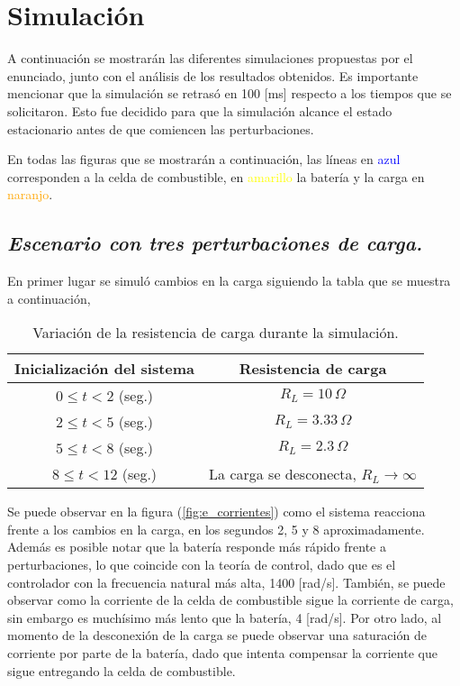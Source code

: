 \section{Simulación}
A continuación se mostrarán las diferentes simulaciones propuestas por el enunciado, junto con el análisis de los resultados obtenidos. Es importante mencionar que la simulación se retrasó en 100 [ms] respecto a los tiempos que se solicitaron. Esto fue decidido para que la simulación alcance el estado estacionario antes de que comiencen las perturbaciones.

En todas las figuras que se mostrarán a continuación, las líneas en \textcolor{blue}{azul}
corresponden a la celda de combustible, en \textcolor{yellow}{amarillo} la
batería y la carga en \textcolor{orange}{naranjo}.

\subsection{\textit{Escenario con tres perturbaciones de carga.}}

En primer lugar se simuló cambios en la carga siguiendo la tabla que se 
muestra a continuación, 

\begin{table}[H]
\centering
\begin{tabular}{|c|c|}
\hline
\textbf{Inicialización del sistema} & \textbf{Resistencia de carga} \\
\hline
$0 \leq t < 2$ (seg.) & $R_L = 10\,\Omega$ \\
\hline
$2 \leq t < 5$ (seg.) & $R_L = 3.33\,\Omega$ \\
\hline
$5 \leq t < 8$ (seg.) & $R_L = 2.3\,\Omega$ \\
\hline
$8 \leq t < 12$ (seg.) & La carga se desconecta, $R_L \rightarrow \infty$ \\
\hline
\end{tabular}
\caption{Variación de la resistencia de carga durante la simulación.}
\label{tab:e}
\end{table}

Se puede observar en la figura (\ref{fig:e_corrientes}) como el sistema reacciona
frente a los cambios en la carga, en los segundos 2, 5 y 8 aproximadamente.
Además es posible notar que la batería responde más rápido frente a perturbaciones,
lo que coincide con la teoría de control, dado que es el controlador con la
frecuencia natural más alta, 1400 [rad/s]. También, se puede observar como la corriente de la celda de combustible
sigue la corriente de carga, sin embargo es muchísimo más lento que la batería, 4 [rad/s]. Por otro lado,
al momento de la desconexión de la carga se puede observar una saturación de corriente por parte
de la batería, dado que intenta compensar la corriente que sigue entregando la celda de combustible.

